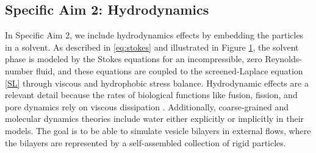 \subsection{Specific Aim 2: Hydrodynamics}
\label{subsec:specific_aim_2}
In Specific Aim 2, we include hydrodynamics effects by embedding the particles in a solvent. 
As described in \eqref{eq:stokes} and illustrated in Figure \ref{fig:flow_map}, 
the solvent phase is modeled by the Stokes equations for an incompressible, zero Reynolds-number fluid, 
and these equations are coupled to the screened-Laplace equation \eqref{SL} through viscous and hydrophobic stress balance.
Hydrodynamic effects are a relevant detail  
because the rates of biological functions like fusion, fission, and pore dynamics rely on viscous dissipation \cite{RYHAM20112929}. 
Additionally, coarse-grained and molecular dynamics theories include water either explicitly or implicitly in their models. 
The goal is to be able to simulate vesicle bilayers in external flows, where the bilayers are represented by a self-assembled collection of rigid particles.

\begin{figure}[h]
    \caption{\label{fig:flow_map}}
\end{figure}


